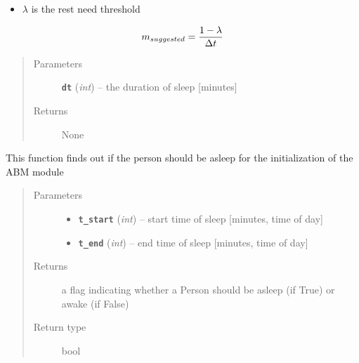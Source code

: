 \documentclass[letterpaper,10pt,english]{sphinxmanual}
\begin{document}
\begin{fulllineitems}
\begin{fulllineitems}
\begin{description}
\begin{itemize}
\item {} 
\(\lambda\) is the rest need threshold

\end{itemize}

\end{description}
\begin{gather}
\begin{split}m_{suggested} = \frac{ 1 - \lambda }{ \Delta{t} }\end{split}\notag
\end{gather}\begin{quote}\begin{description}
\item[{Parameters}] \leavevmode
\textbf{\texttt{dt}} (\emph{int}) -- the duration of sleep {[}minutes{]}

\item[{Returns}] \leavevmode
None

\end{description}\end{quote}

\end{fulllineitems}


\begin{fulllineitems}
\label{rest:rest.Rest.should_be_asleep}
This function finds out if the person should be asleep for the initialization of the ABM module
\begin{quote}\begin{description}
\item[{Parameters}] \leavevmode\begin{itemize}
\item {} 
\textbf{\texttt{t\_start}} (\emph{int}) -- start time of sleep {[}minutes, time of day{]}

\item {} 
\textbf{\texttt{t\_end}} (\emph{int}) -- end time of sleep {[}minutes, time of day{]}

\end{itemize}

\item[{Returns}] \leavevmode
a flag indicating whether a Person should be asleep (if True) or awake (if False)

\item[{Return type}] \leavevmode
bool


\end{description}
\end{quote}
\end{fulllineitems}
\end{fulllineitems}
\end{document}
